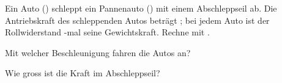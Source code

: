 Ein Auto (\maO) schleppt ein Pannenauto (\mbO) mit einem Abschleppseil ab. Die Antriebskraft des schleppenden Autos beträgt \FAO; bei jedem Auto ist der Rollwiderstand \cRO-mal seine Gewichtskraft. Rechne mit \gO.

\begin{abcliste}
\abc
Mit welcher Beschleunigung fahren die Autos an?

\abc
Wie gross ist die Kraft im Abschleppseil?
\end{abcliste}
